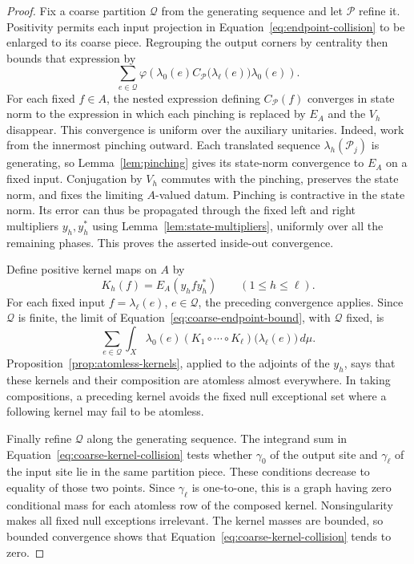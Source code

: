 \begin{proof}
Fix a coarse partition $\mathcal Q$ from the generating sequence and
let $\mathcal P$ refine it. Positivity permits each input projection
in Equation~\eqref{eq:endpoint-collision} to be enlarged to its coarse
piece. Regrouping the output corners by centrality then bounds that
expression by
\begin{equation}
 \sum_{e\in\mathcal Q}
 \varphi\!\left(
    \lambda_0(e)C_{\mathcal P}\bigl(\lambda_\ell(e)\bigr)
    \lambda_0(e)\right).
 \label{eq:coarse-endpoint-bound}
\end{equation}
For each fixed $f\in A$, the nested expression defining
$C_{\mathcal P}(f)$ converges in state norm to the expression in which
each pinching is replaced by $E_A$ and the $V_h$ disappear. This
convergence is uniform over the auxiliary unitaries. Indeed, work from
the innermost pinching outward. Each translated sequence
$\lambda_h(\mathcal P_j)$ is generating, so
Lemma~\ref{lem:pinching} gives its state-norm convergence to $E_A$ on
a fixed input. Conjugation by $V_h$ commutes with the pinching,
preserves the state norm, and fixes the limiting $A$-valued datum.
Pinching is contractive in the state norm. Its error can thus be
propagated through the fixed left and right multipliers $y_h,y_h^*$
using Lemma~\ref{lem:state-multipliers}, uniformly over all the
remaining phases. This proves the asserted inside-out convergence.

Define positive kernel maps on $A$ by
\[
 K_h(f)=E_A(y_hfy_h^*)\qquad(1\le h\le\ell).
\]
For each fixed input $f=\lambda_\ell(e)$, $e\in\mathcal Q$, the preceding
convergence applies. Since $\mathcal Q$ is finite, the limit of
Equation~\eqref{eq:coarse-endpoint-bound}, with $\mathcal Q$ fixed, is
\begin{equation}
 \sum_{e\in\mathcal Q}
   \int_X\lambda_0(e)
       (K_1\circ\cdots\circ K_\ell)
          \bigl(\lambda_\ell(e)\bigr)\,d\mu.
 \label{eq:coarse-kernel-collision}
\end{equation}
Proposition~\ref{prop:atomless-kernels}, applied to the adjoints of the
$y_h$, says that these kernels and their composition are atomless
almost everywhere. In taking compositions, a preceding kernel avoids
the fixed null exceptional set where a following kernel may fail to be
atomless.

Finally refine $\mathcal Q$ along the generating sequence. The
integrand sum in Equation~\eqref{eq:coarse-kernel-collision} tests
whether $\gamma_0$ of the output site and $\gamma_\ell$ of the input
site lie in the same partition piece. These conditions decrease to
equality of those two points. Since $\gamma_\ell$ is one-to-one,
this is a graph having zero conditional mass for each atomless row
of the composed kernel. Nonsingularity makes all fixed null exceptions
irrelevant. The kernel masses are bounded, so bounded convergence shows
that Equation~\eqref{eq:coarse-kernel-collision} tends to zero.


\end{proof}
